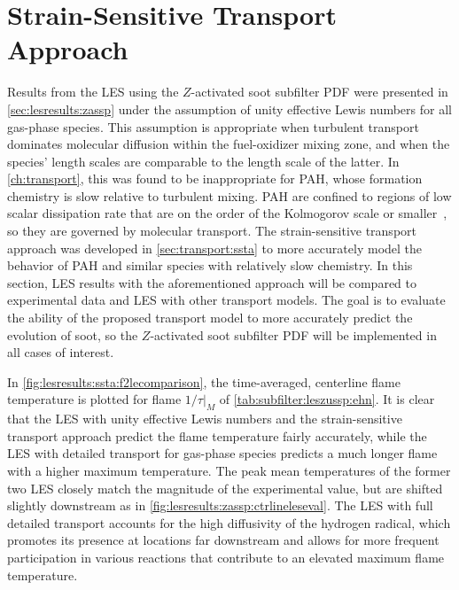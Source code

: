 \section{Strain-Sensitive Transport Approach}
\label{sec:lesresults:ssta}



Results from the LES using the $Z$-activated soot subfilter PDF were presented in \cref{sec:lesresults:zassp} under the assumption of unity effective Lewis numbers for all gas-phase species. This assumption is appropriate when turbulent transport dominates molecular diffusion within the fuel-oxidizer mixing zone, and when the species' length scales are comparable to the length scale of the latter. In \cref{ch:transport}, this was found to be inappropriate for PAH, whose formation chemistry is slow relative to turbulent mixing. PAH are confined to regions of low scalar dissipation rate that are on the order of the Kolmogorov scale or smaller~\cite{vaishnavi2008}, so they are governed by molecular transport. The strain-sensitive transport approach was developed in \cref{sec:transport:ssta} to more accurately model the behavior of PAH and similar species with relatively slow chemistry. In this section, LES results with the aforementioned approach will be compared to experimental data and LES with other transport models. The goal is to evaluate the ability of the proposed transport model to more accurately predict the evolution of soot, so the $Z$-activated soot subfilter PDF will be implemented in all cases of interest.

In \cref{fig:lesresults:ssta:f2lecomparison}, the time-averaged, centerline flame temperature is plotted for flame $1/\tau|_M$ of \cref{tab:subfilter:leszussp:ehn}. It is clear that the LES with unity effective Lewis numbers and the strain-sensitive transport approach predict the flame temperature fairly accurately, while the LES with detailed transport for gas-phase species predicts a much longer flame with a higher maximum temperature. The peak mean temperatures of the former two LES closely match the magnitude of the experimental value, but are shifted slightly downstream as in \cref{fig:lesresults:zassp:ctrlineleseval}. The LES with full detailed transport accounts for the high diffusivity of the hydrogen radical, which promotes its presence at locations far downstream and allows for more frequent participation in various reactions that contribute to an elevated maximum flame temperature.

